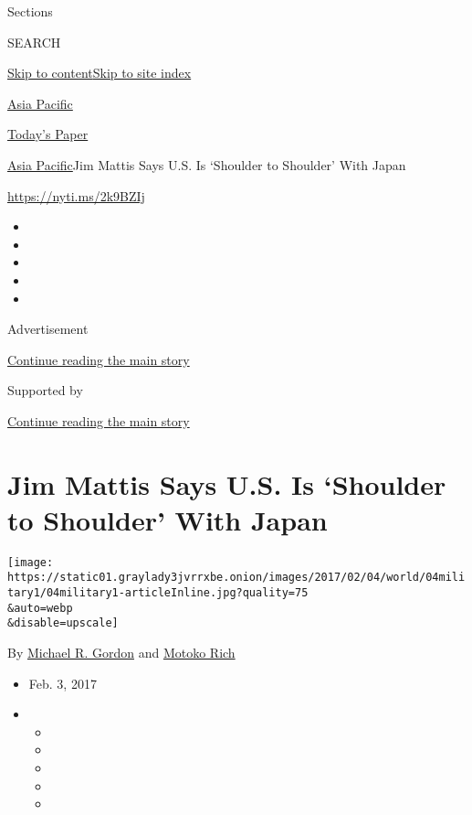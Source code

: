 Sections

SEARCH

\protect\hyperlink{site-content}{Skip to
content}\protect\hyperlink{site-index}{Skip to site index}

\href{https://www.nytimes3xbfgragh.onion/section/world/asia}{Asia
Pacific}

\href{https://myaccount.nytimes3xbfgragh.onion/auth/login?response_type=cookie\&client_id=vi}{}

\href{https://www.nytimes3xbfgragh.onion/section/todayspaper}{Today's
Paper}

\href{/section/world/asia}{Asia Pacific}\textbar{}Jim Mattis Says U.S.
Is `Shoulder to Shoulder' With Japan

\url{https://nyti.ms/2k9BZIj}

\begin{itemize}
\item
\item
\item
\item
\item
\end{itemize}

Advertisement

\protect\hyperlink{after-top}{Continue reading the main story}

Supported by

\protect\hyperlink{after-sponsor}{Continue reading the main story}

\hypertarget{jim-mattis-says-us-is-shoulder-to-shoulder-with-japan}{%
\section{Jim Mattis Says U.S. Is `Shoulder to Shoulder' With
Japan}\label{jim-mattis-says-us-is-shoulder-to-shoulder-with-japan}}

\texttt{[image: https://static01.graylady3jvrrxbe.onion/images/2017/02/04/world/04military1/04military1-articleInline.jpg?quality=75\\\&auto=webp\\\&disable=upscale]}

By \href{http://www.nytimes3xbfgragh.onion/by/michael-r-gordon}{Michael
R. Gordon} and
\href{http://www.nytimes3xbfgragh.onion/by/motoko-rich}{Motoko Rich}

\begin{itemize}
\item
  Feb. 3, 2017
\item
  \begin{itemize}
  \item
  \item
  \item
  \item
  \item
  \end{itemize}
\end{itemize}

